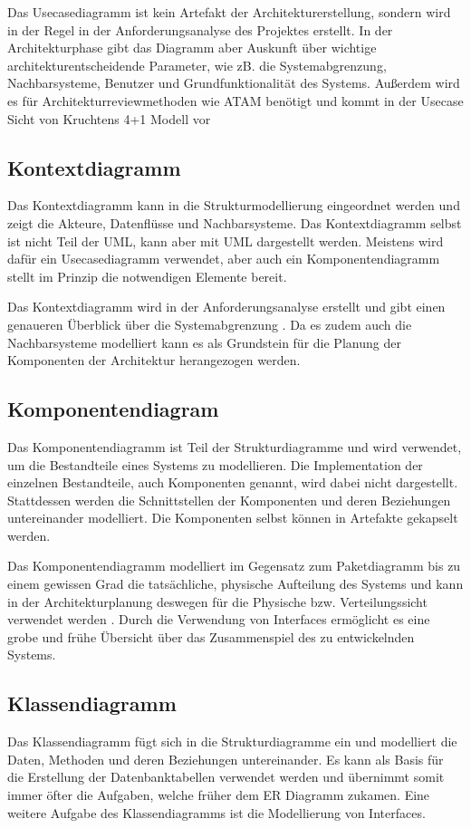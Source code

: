 Das Usecasediagramm ist kein Artefakt der Architekturerstellung, sondern wird in der Regel in der Anforderungsanalyse des Projektes erstellt. In der Architekturphase gibt das Diagramm aber Auskunft über wichtige architekturentscheidende Parameter, wie zB. die Systemabgrenzung, Nachbarsysteme, Benutzer und Grundfunktionalität des Systems. Außerdem wird es für Architekturreviewmethoden wie ATAM benötigt und kommt in der Usecase Sicht von Kruchtens 4+1 Modell vor \cite[S. 148]{basiswissen}

\subsection{Kontextdiagramm}
Das Kontextdiagramm kann in die Strukturmodellierung eingeordnet werden und zeigt die Akteure, Datenflüsse und Nachbarsysteme. Das Kontextdiagramm selbst ist nicht Teil der UML, kann aber mit UML dargestellt werden. Meistens wird dafür ein Usecasediagramm verwendet, aber auch ein Komponentendiagramm stellt im Prinzip die notwendigen Elemente bereit. \cite[S. 255]{glasklar}

Das Kontextdiagramm wird in der Anforderungsanalyse erstellt und gibt einen genaueren Überblick über die Systemabgrenzung \cite[S. 255]{glasklar}. Da es zudem auch die Nachbarsysteme modelliert kann es als Grundstein für die Planung der Komponenten der Architektur herangezogen werden.


\subsection{Komponentendiagram}
Das Komponentendiagramm ist Teil der Strukturdiagramme und wird verwendet, um die Bestandteile eines Systems zu modellieren. Die Implementation der einzelnen Bestandteile, auch Komponenten genannt, wird dabei nicht dargestellt. Stattdessen werden die Schnittstellen der Komponenten und deren Beziehungen untereinander modelliert. Die Komponenten selbst können in Artefakte gekapselt werden. \cite[S. 216]{glasklar}

Das Komponentendiagramm modelliert im Gegensatz zum Paketdiagramm bis zu einem gewissen Grad die tatsächliche, physische Aufteilung des Systems und kann in der Architekturplanung deswegen für die Physische bzw. Verteilungssicht verwendet werden \cite[S. 223]{glasklar}\cite[S. 139]{basiswissen}. Durch die Verwendung von Interfaces ermöglicht es eine grobe und frühe Übersicht über das Zusammenspiel des zu entwickelnden Systems.

\subsection{Klassendiagramm}
Das Klassendiagramm fügt sich in die Strukturdiagramme ein und modelliert die Daten, Methoden und deren Beziehungen untereinander. Es kann als Basis für die Erstellung der Datenbanktabellen verwendet werden und übernimmt somit immer öfter die Aufgaben, welche früher dem ER Diagramm zukamen. Eine weitere Aufgabe des Klassendiagramms ist die Modellierung von Interfaces. \cite[S. 108-110]{glasklar}

